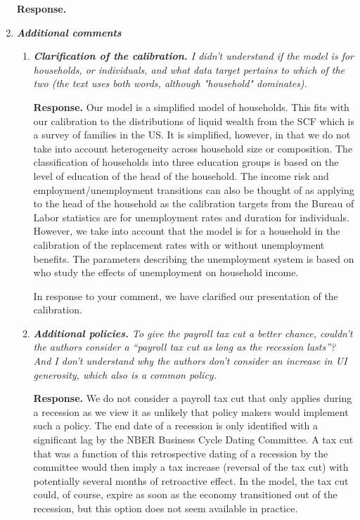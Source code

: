 \documentclass[12pt,letterpaper,english]{article}
\begin{document}
\begin{enumerate}
	\noindent \textbf{Response.} 

\bigskip
\bigskip

\item \textit{\textbf{Additional comments}} 

	\begin{enumerate}
		\item \textit{\textbf{Clarification of the calibration.} I didn't understand if the model is for households, or individuals, and what data target pertains to which of the two (the text uses both words, although "household" dominates).}
		
		\noindent \textbf{Response.} Our model is a simplified model of households. This fits with our calibration to the distributions of liquid wealth from the SCF which is a survey of families in the US. It is simplified, however, in that we do not take into account heterogeneity across household size or composition. The classification of households into three education groups is based on the level of education of the head of the household. The income risk and employment/unemployment transitions can also be thought of as applying to the head of the household as the calibration targets from the Bureau of Labor statistics are for unemployment rates and duration for individuals. However, we take into account that the model is for a household in the calibration of the replacement rates with or without unemployment benefits. The parameters describing the unemployment system is based on \citet{rothstein2017scraping} who study the effects of unemployment on household income. 
		
		In response to your comment, we have clarified our presentation of the calibration. 
		
		\item \textit{\textbf{Additional policies.} To give the payroll tax cut a better chance, couldn't the authors consider a ``payroll tax cut as long as the recession lasts''? And I don't understand why the authors don't consider an increase in UI generosity, which also is a common policy.}
						
		\noindent \textbf{Response.} We do not consider a payroll tax cut that only applies during a recession as we view it as unlikely that policy makers would implement such a policy. The end date of a recession is only identified with a significant lag by the NBER Business Cycle Dating Committee. A tax cut that was a function of this retrospective dating of a recession by the committee would then imply a tax increase (reversal of the tax cut) with potentially several months of retroactive effect. In the model, the tax cut could, of course, expire as soon as the economy transitioned out of the recession, but this option does not seem available in practice. 
		

\end{enumerate}
\end{enumerate}
\end{document}
